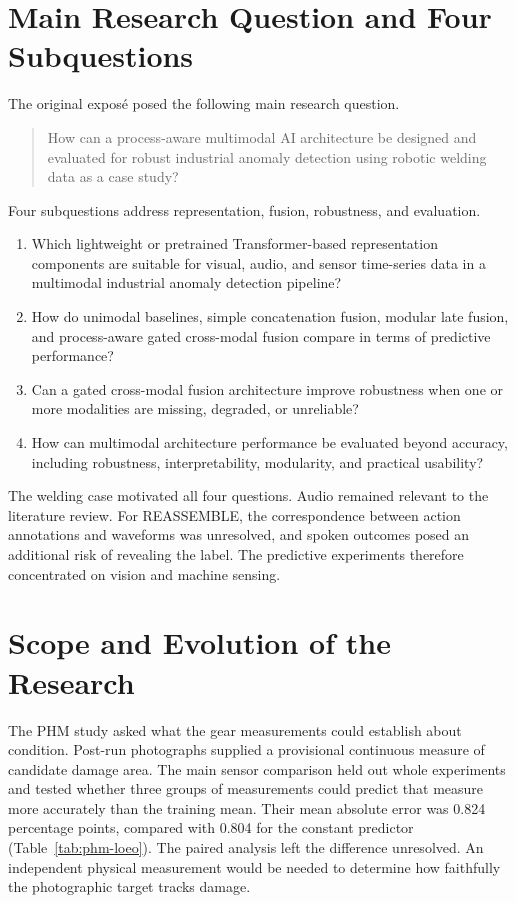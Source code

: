 \section{Main Research Question and Four Subquestions}
The original expos\'{e} posed the following main research question.
\begin{quote}
How can a process-aware multimodal AI architecture be designed and evaluated for robust industrial anomaly detection using robotic welding data as a case study?
\end{quote}
Four subquestions address representation, fusion, robustness, and evaluation.
\begin{enumerate}[label=SQ\arabic*.,leftmargin=16mm]
\item Which lightweight or pretrained Transformer-based representation components are suitable for visual, audio, and sensor time-series data in a multimodal industrial anomaly detection pipeline?
\item How do unimodal baselines, simple concatenation fusion, modular late fusion, and process-aware gated cross-modal fusion compare in terms of predictive performance?
\item Can a gated cross-modal fusion architecture improve robustness when one or more modalities are missing, degraded, or unreliable?
\item How can multimodal architecture performance be evaluated beyond accuracy, including robustness, interpretability, modularity, and practical usability?
\end{enumerate}
The welding case motivated all four questions. Audio remained relevant to the literature review. For REASSEMBLE, the correspondence between action annotations and waveforms was unresolved, and spoken outcomes posed an additional risk of revealing the label. The predictive experiments therefore concentrated on vision and machine sensing.

\section{Scope and Evolution of the Research}
The PHM study asked what the gear measurements could establish about condition. Post-run photographs supplied a provisional continuous measure of candidate damage area. The main sensor comparison held out whole experiments and tested whether three groups of measurements could predict that measure more accurately than the training mean. Their mean absolute error was 0.824 percentage points, compared with 0.804 for the constant predictor (Table~\ref{tab:phm-loeo}). The paired analysis left the difference unresolved. An independent physical measurement would be needed to determine how faithfully the photographic target tracks damage.

